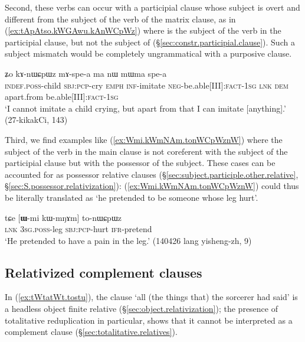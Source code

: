  Second, these verbs can occur with a participial clause whose subject is overt and different from the subject of the verb of the matrix clause, as in (\ref{ex:tApAtso.kWGAwu.kAnWCpWz}) where   is the subject of the verb  in the participial clause, but not the subject of   (§\ref{sec:constr.participial.clause}). Such a subject mismatch would be completely ungrammatical with a purposive clause.
 
\begin{exe}
\ex \label{ex:tApAtso.kWGAwu.kAnWCpWz}
  ʑo kɤ-nɯɕpɯz mɤ-spe-a ma nɯ mɯma spe-a \\
 \textsc{indef}.\textsc{poss}-child \textsc{sbj}:\textsc{pcp}-cry \textsc{emph} \textsc{inf}-imitate \textsc{neg}-be.able[III]:\textsc{fact}-\textsc{1sg} \textsc{lnk} \textsc{dem} apart.from be.able[III]:\textsc{fact}-\textsc{1sg} \\
\glt `I cannot imitate a child crying, but apart from that I can imitate [anything].' (27-kikakCi, 143)
\end{exe}

Third, we find examples like (\ref{ex:Wmi.kWmNAm.tonWCpWznW}) where the subject of the verb in the main clause is not coreferent with the subject of the participial clause but with the possessor of the subject. These cases can be accounted for as possessor relative clauses (§\ref{sec:subject.participle.other.relative}, §\ref{sec:S.possessor.relativization}):  (\ref{ex:Wmi.kWmNAm.tonWCpWznW}) could thus be literally translated as `he pretended to be someone whose leg hurt'.

\begin{exe}
\ex \label{ex:Wmi.kWmNAm.tonWCpWznW}
 \gll  tɕe [\textbf{ɯ}-mi kɯ-mŋɤm] to-nɯɕpɯz  \\
 \textsc{lnk} \textsc{3sg}.\textsc{poss}-leg \textsc{sbj}:\textsc{pcp}-hurt \textsc{ifr}-pretend \\
 \glt `He pretended to have a pain in the leg.' (140426 lang yisheng-zh, 9)
\end{exe}

 \subsection{Relativized complement clauses}  \label{sec:relativized.complement.clause}
In (\ref{ex:tWtatWt.tostu}),  the clause  `all (the things that) the sorcerer had said' is a headless object finite relative (§\ref{sec:object.relativization}); the presence of totalitative reduplication in particular, shows that it cannot be interpreted as a complement clause (§\ref{sec:totalitative.relatives}).

